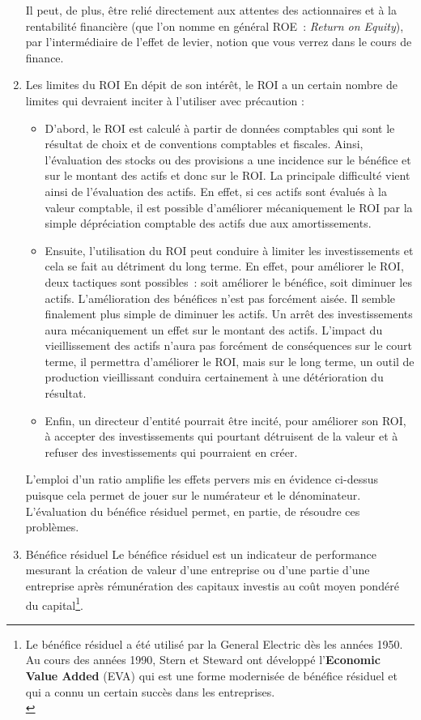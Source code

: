 \documentclass{tufte-handout}
\begin{document}
\begin{enumerate}
Il peut, de plus, être relié directement aux attentes des actionnaires et à la rentabilité financière (que l'on nomme en général ROE : \emph{Return on Equity}), par l'intermédiaire de l'effet de levier, notion que vous verrez dans le cours de finance.\\
\item Les limites du ROI
\label{sec:org94cfbd4}
En dépit de son intérêt, le ROI a un certain nombre de limites qui devraient inciter à l'utiliser avec précaution :\\
\begin{itemize}
\item D'abord, le ROI est calculé à partir de données comptables qui sont le résultat de choix et de conventions comptables et fiscales. Ainsi, l'évaluation des stocks ou des provisions a une incidence sur le bénéfice et sur le montant des actifs et donc sur le ROI. La principale difficulté vient ainsi de l'évaluation des actifs. En effet, si ces actifs sont évalués à la valeur comptable, il est possible d'améliorer mécaniquement le ROI par la simple dépréciation comptable des actifs due aux amortissements.\\
\item Ensuite, l'utilisation du ROI peut conduire à limiter les investissements et cela se fait au détriment du long terme. En effet, pour améliorer le ROI, deux tactiques sont possibles : soit améliorer le bénéfice, soit diminuer les actifs. L'amélioration des bénéfices n'est pas forcément aisée. Il semble finalement plus simple de diminuer les actifs. Un arrêt des investissements aura mécaniquement un effet sur le montant des actifs. L'impact du vieillissement des actifs n'aura pas forcément de conséquences sur le court terme, il permettra d'améliorer le ROI, mais sur le long terme, un outil de production vieillissant conduira certainement à une détérioration du résultat.\\
\item Enfin, un directeur d'entité pourrait être incité, pour améliorer son ROI, à accepter des investissements qui pourtant détruisent de la valeur et à refuser des investissements qui pourraient en créer.\\
\end{itemize}

L'emploi d'un ratio amplifie les effets pervers mis en évidence ci-dessus puisque cela permet de jouer sur le numérateur et le dénominateur. L'évaluation du bénéfice résiduel permet, en partie, de résoudre ces problèmes.\\
\item Bénéfice résiduel
\label{sec:org51c0c2b}
Le bénéfice résiduel est un indicateur de performance mesurant la création de valeur d'une entreprise ou d'une partie d'une entreprise après rémunération des capitaux investis au coût moyen pondéré du capital\footnote{Le bénéfice résiduel a été utilisé par la General Electric dès les années 1950. Au cours des années 1990, Stern et Steward ont développé l'\textbf{Economic Value Added} (EVA) qui est une forme modernisée de bénéfice résiduel et qui a connu un certain succès dans les entreprises.\\}.\\


\end{enumerate}
\end{document}
